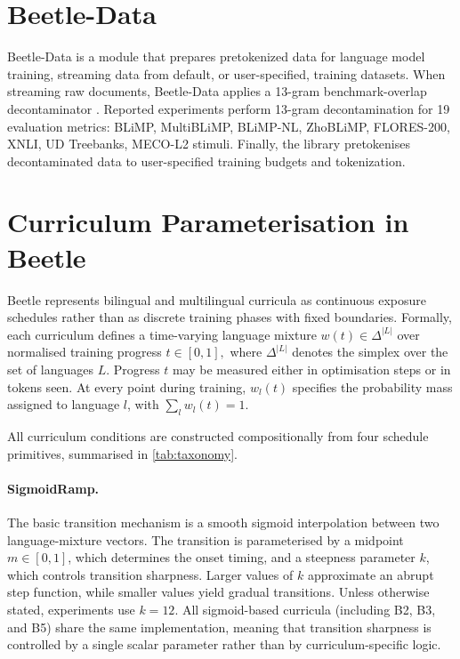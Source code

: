 \documentclass[11pt]{article}
\newcommand{\beetle}{Beetle} %
\begin{document}
\section{Beetle-Data}\label{sec:beetle-data}

 Beetle-Data is a module that prepares pretokenized data for language model training, streaming data from default, or user-specified, training datasets. When streaming raw documents, Beetle-Data applies a 13-gram benchmark-overlap decontaminator  \citep{brown2020language}. Reported experiments perform 13-gram decontamination for 19 evaluation metrics: BLiMP, MultiBLiMP, BLiMP-NL, ZhoBLiMP, FLORES-200, XNLI, UD Treebanks, MECO-L2 stimuli. Finally, the library pretokenises decontaminated data to user-specified training budgets and tokenization. 


\section{Curriculum Parameterisation in \beetle{}}\label{app:curricula}

\beetle{} represents bilingual and multilingual curricula as continuous
exposure schedules rather than as discrete training phases with fixed
boundaries. Formally, each curriculum defines a time-varying language mixture
\(
w(t) \in \Delta^{|L|}
\)
over normalised training progress
\(
t \in [0,1],
\)
where \(\Delta^{|L|}\) denotes the simplex over the set of languages \(L\).
Progress \(t\) may be measured either in optimisation steps or in tokens seen.
At every point during training, \(w_l(t)\) specifies the probability mass
assigned to language \(l\), with
\(
\sum_l w_l(t)=1.
\)

All curriculum conditions are constructed compositionally from four schedule primitives, summarised in \autoref{tab:taxonomy}. 

\paragraph{SigmoidRamp.}
The basic transition mechanism is a smooth sigmoid interpolation between two
language-mixture vectors. The transition is parameterised by a midpoint
\(m \in [0,1]\), which determines the onset timing, and a steepness parameter
\(k\), which controls transition sharpness. Larger values of \(k\) approximate
an abrupt step function, while smaller values yield gradual transitions. Unless
otherwise stated, experiments use \(k=12\). All sigmoid-based curricula
(including B2, B3, and B5) share the same implementation, meaning that
transition sharpness is controlled by a single scalar parameter rather than by
curriculum-specific logic.
\end{document}
